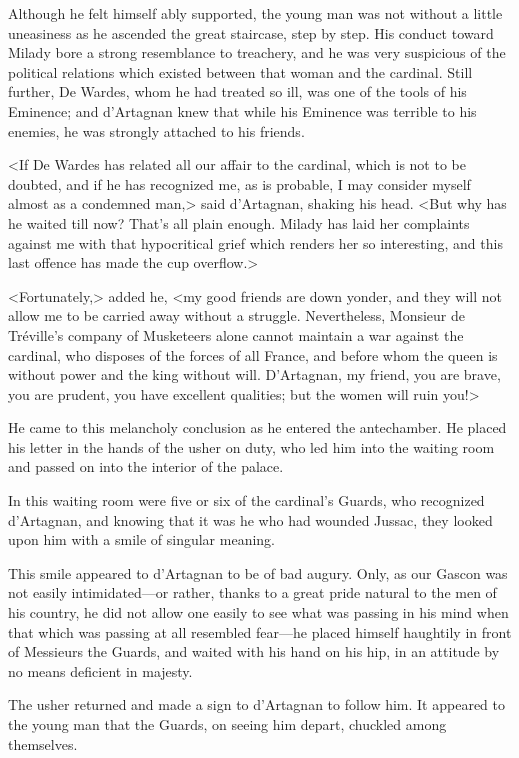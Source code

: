 Although he felt himself ably supported, the young man was not without a little uneasiness as he ascended the great staircase, step by step. His conduct toward Milady bore a strong resemblance to treachery, and he was very suspicious of the political relations which existed between that woman and the cardinal. Still further, De Wardes, whom he had treated so ill, was one of the tools of his Eminence; and d'Artagnan knew that while his Eminence was terrible to his enemies, he was strongly attached to his friends. 

<If De Wardes has related all our affair to the cardinal, which is not to be doubted, and if he has recognized me, as is probable, I may consider myself almost as a condemned man,> said d'Artagnan, shaking his head. <But why has he waited till now? That's all plain enough. Milady has laid her complaints against me with that hypocritical grief which renders her so interesting, and this last offence has made the cup overflow.> 

<Fortunately,> added he, <my good friends are down yonder, and they will not allow me to be carried away without a struggle. Nevertheless, Monsieur de Tréville's company of Musketeers alone cannot maintain a war against the cardinal, who disposes of the forces of all France, and before whom the queen is without power and the king without will. D'Artagnan, my friend, you are brave, you are prudent, you have excellent qualities; but the women will ruin you!> 

He came to this melancholy conclusion as he entered the antechamber. He placed his letter in the hands of the usher on duty, who led him into the waiting room and passed on into the interior of the palace. 

In this waiting room were five or six of the cardinal's Guards, who recognized d'Artagnan, and knowing that it was he who had wounded Jussac, they looked upon him with a smile of singular meaning. 

This smile appeared to d'Artagnan to be of bad augury. Only, as our Gascon was not easily intimidated---or rather, thanks to a great pride natural to the men of his country, he did not allow one easily to see what was passing in his mind when that which was passing at all resembled fear---he placed himself haughtily in front of Messieurs the Guards, and waited with his hand on his hip, in an attitude by no means deficient in majesty. 

The usher returned and made a sign to d'Artagnan to follow him. It appeared to the young man that the Guards, on seeing him depart, chuckled among themselves. 

